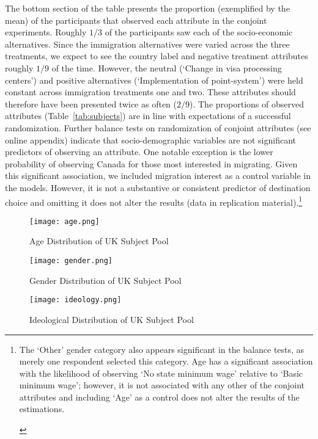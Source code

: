\documentclass[12pt]{article}
\newcommand{\note}[1]{\footnote{\begin{doublespace}#1\end{doublespace}}}
\begin{document}
\begin{appendices}
The bottom section of the table presents the proportion (exemplified by the mean) of the participants that observed each attribute in the conjoint experiments. Roughly $1/3$ of the participants saw each of the socio-economic alternatives. Since the immigration alternatives were varied across the three treatments, we expect to see the country label and negative treatment attributes roughly $1/9$ of the time. However, the neutral (`Change in visa processing centers') and positive alternatives (`Implementation of point-system') were held constant across immigration treatments one and two. These attributes should therefore have been presented twice as often ($2/9$). The proportions of observed attributes (Table~\ref{tab:subjects}) are in line with expectations of a successful randomization. Further balance tests on randomization of conjoint attributes (see online appendix) indicate that socio-demographic variables are not significant predictors of observing an attribute. One notable exception is the lower probability of observing Canada for those most interested in migrating. Given this significant association, we included migration interest as a control variable in the models. However, it is not a substantive or consistent predictor of destination choice and omitting it does not alter the results (data in replication material).\note{The `Other' gender category also appears significant in the balance tests, as merely one respondent selected this category. Age has a significant association with the likelihood of observing `No state minimum wage' relative to `Basic minimum wage'; however, it is not associated with any other of the conjoint attributes and including `Age' as a control does not alter the results of the estimations.}


\begin{figure}[!ht]
\caption{Age Distribution of UK Subject Pool}\label{fig:describe_one}
\centerline{\texttt{[image: age.png]}}
\end{figure}

\clearpage

\begin{figure}[!ht]
\caption{Gender Distribution of UK Subject Pool}\label{fig:describe_two}
\centerline{\texttt{[image: gender.png]}}
\end{figure}

\clearpage

\begin{figure}[!ht]
\caption{Ideological Distribution of UK Subject Pool}\label{fig:describe_three}
\centerline{\texttt{[image: ideology.png]}}
\end{figure}



\end{appendices}
\end{document}
